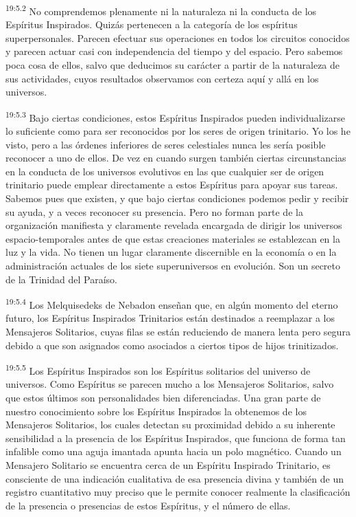 \par
\textsuperscript{19:5.2} No comprendemos plenamente ni la naturaleza ni la conducta de los Espíritus Inspirados. Quizás pertenecen a la categoría de los espíritus superpersonales. Parecen efectuar sus operaciones en todos los circuitos conocidos y parecen actuar casi con independencia del tiempo y del espacio. Pero sabemos poca cosa de ellos, salvo que deducimos su carácter a partir de la naturaleza de sus actividades, cuyos resultados observamos con certeza aquí y allá en los universos.

\par
\textsuperscript{19:5.3} Bajo ciertas condiciones, estos Espíritus Inspirados pueden individualizarse lo suficiente como para ser reconocidos por los seres de origen trinitario. Yo los he visto, pero a las órdenes inferiores de seres celestiales nunca les sería posible reconocer a uno de ellos. De vez en cuando surgen también ciertas circunstancias en la conducta de los universos evolutivos en las que cualquier ser de origen trinitario puede emplear directamente a estos Espíritus para apoyar sus tareas. Sabemos pues que existen, y que bajo ciertas condiciones podemos pedir y recibir su ayuda, y a veces reconocer su presencia. Pero no forman parte de la organización manifiesta y claramente revelada encargada de dirigir los universos espacio-temporales antes de que estas creaciones materiales se establezcan en la luz y la vida. No tienen un lugar claramente discernible en la economía o en la administración actuales de los siete superuniversos en evolución. Son un secreto de la Trinidad del Paraíso.

\par
\textsuperscript{19:5.4} Los Melquisedeks de Nebadon enseñan que, en algún momento del eterno futuro, los Espíritus Inspirados Trinitarios están destinados a reemplazar a los Mensajeros Solitarios, cuyas filas se están reduciendo de manera lenta pero segura debido a que son asignados como asociados a ciertos tipos de hijos trinitizados.

\par
\textsuperscript{19:5.5} Los Espíritus Inspirados son los Espíritus solitarios del universo de universos. Como Espíritus se parecen mucho a los Mensajeros Solitarios, salvo que estos últimos son personalidades bien diferenciadas. Una gran parte de nuestro conocimiento sobre los Espíritus Inspirados la obtenemos de los Mensajeros Solitarios, los cuales detectan su proximidad debido a su inherente sensibilidad a la presencia de los Espíritus Inspirados, que funciona de forma tan infalible como una aguja imantada apunta hacia un polo magnético. Cuando un Mensajero Solitario se encuentra cerca de un Espíritu Inspirado Trinitario, es consciente de una indicación cualitativa de esa presencia divina y también de un registro cuantitativo muy preciso que le permite conocer realmente la clasificación de la presencia o presencias de estos Espíritus, y el número de ellas.

